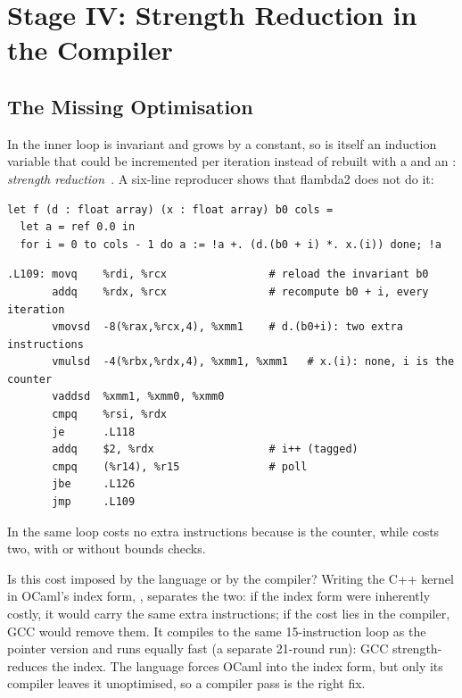 \section{Stage IV: Strength Reduction in the Compiler}
\label{sec:sr}

\subsection{The Missing Optimisation}
In the inner loop  is invariant and  grows by a constant, so
 is itself an induction variable that could be incremented per
iteration instead of rebuilt with a  and an : \emph{strength
reduction}~\cite{cocke1977strength}. A six-line reproducer shows that flambda2
does not do it:

\begin{lstlisting}[language=OCamlX,caption={Strength-reduction reproducer.},label=lst:sr-repro,numbers=none]
let f (d : float array) (x : float array) b0 cols =
  let a = ref 0.0 in
  for i = 0 to cols - 1 do a := !a +. (d.(b0 + i) *. x.(i)) done; !a
\end{lstlisting}

\begin{lstlisting}[language=asmX,caption={Its inner loop under OxCaml 5.2.0+ox, \texttt{-O3 -unsafe}.},label=lst:sr-asm]
.L109: movq    %rdi, %rcx                # reload the invariant b0
       addq    %rdx, %rcx                # recompute b0 + i, every iteration
       vmovsd  -8(%rax,%rcx,4), %xmm1    # d.(b0+i): two extra instructions
       vmulsd  -4(%rbx,%rdx,4), %xmm1, %xmm1   # x.(i): none, i is the counter
       vaddsd  %xmm1, %xmm0, %xmm0
       cmpq    %rsi, %rdx
       je      .L118
       addq    $2, %rdx                  # i++ (tagged)
       cmpq    (%r14), %r15              # poll
       jbe     .L126
       jmp     .L109
\end{lstlisting}

In the same loop  costs no extra instructions because  is
the counter, while  costs two, with or without bounds checks.

Is this cost imposed by the language or by the compiler? Writing the C++
kernel in OCaml's index form, , separates the two: if the
index form were inherently costly, it would carry the same extra
instructions; if the cost lies in the compiler, GCC would remove them. It
compiles to the same 15-instruction loop as the pointer version and runs
equally fast (a separate 21-round run): GCC strength-reduces the index. The
language forces OCaml into the index form, but only its compiler leaves it
unoptimised, so a compiler pass is the right fix.

